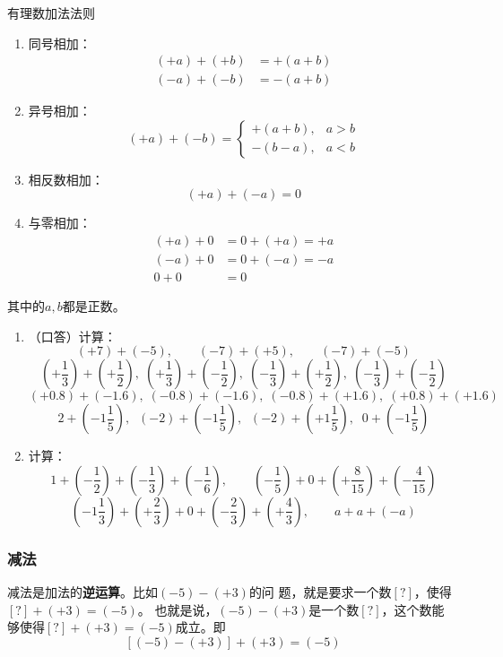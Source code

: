 \begin{blk}{有理数加法法则}
	\begin{enumerate}
		\item 同号相加：
		\[\begin{split}
		(+a)+(+b)&=+(a+b)\\
		(-a)+(-b)&=-(a+b)
		\end{split}\]
		\item 异号相加：
		\[(+a)+(-b)=\begin{cases}
		+(a+b),& a>b\\
		-(b-a),&a<b
		\end{cases}\]
		\item 相反数相加：
		\[(+a)+(-a)=0\]
		\item 与零相加：
		\[\begin{split}
		(+a)+0&=0+(+a)=+a\\
		(-a)+0&=0+(-a)=-a\\
		0+0&=0
		\end{split}\]
	\end{enumerate}    
	其中的$a,b$都是正数。
\end{blk}

\begin{ex}
	\begin{enumerate}
		\item （口答）计算：
		\[(+7)+(-5),\qquad (-7)+(+5),\qquad (-7)+(-5) \]
		\[\left(+\frac{1}{3}\right)+\left(+\frac{1}{2}\right),\; \left(+\frac{1}{3}\right)+\left(-\frac{1}{2}\right),\; \left(-\frac{1}{3}\right)+\left(+\frac{1}{2}\right) ,\; \left(-\frac{1}{3}\right)+\left(-\frac{1}{2}\right) \]
		\[(+0.8)+(-1.6),\; (-0.8)+(-1.6),\; (-0.8)+(+1.6),\; (+0.8)+(+1.6) \]
		\[2+\left(-1\frac{1}{5}\right),\;\;(-2)+\left(-1\frac{1}{5}\right),\;\;(-2)+\left(+1\frac{1}{5}\right),\;\; 0+\left(-1\frac{1}{5}\right)\]
		\item 计算：
		\[1+\left(-\frac{1}{2}\right)+\left(-\frac{1}{3}\right)+\left(-\frac{1}{6}\right),\qquad \left(-\frac{1}{5}\right)+0+\left(+\frac{8}{15}\right)+\left(-\frac{4}{15}\right) \]
		\[\left(-1\frac{1}{3}\right)+\left(+\frac{2}{3}\right)+0+\left(-\frac{2}{3}\right)+\left(+\frac{4}{3}\right),\qquad a+a+(-a) \]
	\end{enumerate}
\end{ex}

\subsubsection{减法}

减法是加法的\textbf{逆运算}。比如$(-5)-(+3)$的问
题，就是要求一个数$[?]$，使得$[?]+(+3)=(-5)$。
也就是说，$(-5)-(+ 3)$是一个数$[?]$，这个数能
够使得$[?]+(+3)=(-5)$成立。即
$$[(-5)-(+3) ]+(+3)=(-5)$$

